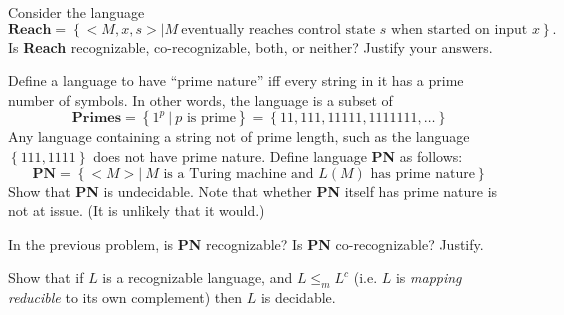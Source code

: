 \documentclass[12pt,letterpaper,boxed,cm]{hmcpset}
\newcommand{\set}[1]{\left\{#1\right\}}
\begin{document}

\begin{problem}[1.]
    [2 points] Consider the language 
    \[
        \mathbf{Reach} = \set{<M, x, s> | M~\text{eventually reaches control state $s$ when started on input $x$}}. 
    \]
    Is \textbf{Reach} recognizable, co-recognizable, both, or neither? Justify your answers.
\end{problem}

\begin{solution}
    \vfill
\end{solution}
\newpage

\begin{problem}[2.]
    [6 points] Define a language to have ``prime nature'' iff every string in it has a prime number of symbols. In other words, the language is a subset of 
    \[
        \mathbf{Primes} = \set{1^p~|~p\text{ is prime}} = \set{11, 111, 11111, 1111111, \ldots}
    \]
    Any language containing a string not of prime length, such as the language $\set{111, 1111}$ does not have prime nature. Define language \textbf{PN} as follows:
    \[
        \textbf{PN} = \set{ <M> |~M\text{ is a Turing machine and $L(M)$ has prime nature} }
    \]
    Show that \textbf{PN} is undecidable. Note that whether \textbf{PN} itself has prime nature is not
    at issue. (It is unlikely that it would.)
\end{problem}

\begin{solution}
    \vfill
\end{solution}
\newpage

\begin{problem}[3.]
    [2 points] In the previous problem, is \textbf{PN} recognizable? Is \textbf{PN} co-recognizable? Justify.
\end{problem}

\begin{solution}
    \vfill
\end{solution}
\newpage

\begin{problem}[4.]
    [2 points] Show that if $L$ is a recognizable language, and $L \le_m L^c$ (i.e. $L$ is \emph{mapping reducible} to its own complement) then $L$ is decidable.
\end{problem}

\begin{solution}
    \vfill
\end{solution}
\newpage
\end{document}
